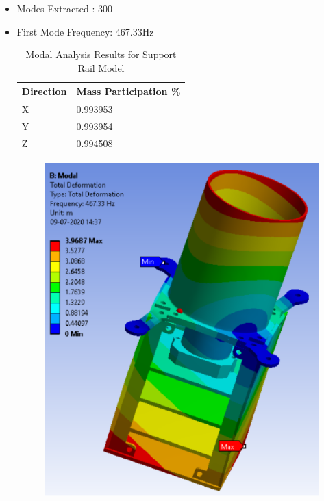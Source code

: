 \documentclass[../../main.tex]{subfiles}
\begin{document}
\begin{enumerate}
\begin{enumerate}
\begin{enumerate}
                \begin{itemize}
                    \item Modes Extracted : 300
                    \item First Mode Frequency: 467.33Hz
                    \begin{table}[h!]
                        \centering
                        \begin{tabular}{|p{3cm}|p{5cm}|}
                            \hline
                            \textbf{Direction} & \textbf{Mass Participation \%} \\
                            \hline
                            X & 0.993953     \\
                            \hline
                            Y & 0.993954     \\
                            \hline
                            Z & 0.994508  \\
                            \hline
                        \end{tabular}
                        \caption{Modal Analysis Results for Support Rail Model}
                        \label{tab:my_label}
                    \end{table}
                    \begin{figure}[H]
                    \centering
                    \includegraphics[scale=0.8]{Figures/Mechanical/First_Mode_Shape.PNG}

\end{figure}
\end{itemize}
\end{enumerate}
\end{enumerate}
\end{enumerate}
\end{document}
